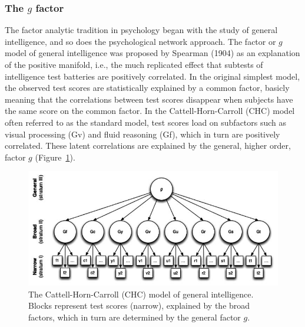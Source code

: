\documentclass[
  a4paper,
  DIV=11,
  numbers=noendperiod,
  oneside]{scrreprt}
\begin{document}
\hypertarget{sec-The-g-factor}{%
\subsubsection{\texorpdfstring{The \(g\)
factor}{The g factor}}\label{sec-The-g-factor}}

The factor analytic tradition in psychology began with the study of
general intelligence, and so does the psychological network approach.
The factor or \(g\) model of general intelligence was proposed by
Spearman (1904) as an explanation of the positive manifold, i.e., the
much replicated effect that subtests of intelligence test batteries are
positively correlated. In the original simplest model, the observed test
scores are statistically explained by a common factor, basicly meaning
that the correlations between test scores disappear when subjects have
the same score on the common factor. In the Cattell-Horn-Carroll (CHC)
model often referred to as the standard model, test scores load on
subfactors such as visual processing (Gv) and fluid reasoning (Gf),
which in turn are positively correlated. These latent correlations are
explained by the general, higher order, factor \(g\)
(Figure~\ref{fig-ch6-img4-old-73}).

\begin{figure}

{\centering \includegraphics{media/ch6/image4.jpg}

}

\caption{\label{fig-ch6-img4-old-73}The Cattell-Horn-Carroll (CHC) model
of general intelligence. Blocks represent test scores (narrow),
explained by the broad factors, which in turn are determined by the
general factor \(g\).}

\end{figure}
\end{document}
